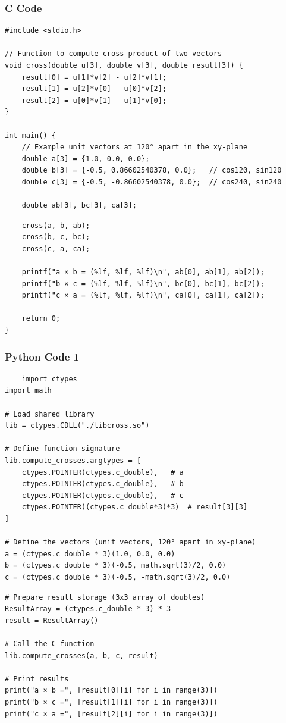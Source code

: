 \documentclass{beamer}
\begin{document}
\begin{frame}[fragile]
    \frametitle{C Code}
    \begin{lstlisting}
#include <stdio.h>

// Function to compute cross product of two vectors
void cross(double u[3], double v[3], double result[3]) {
    result[0] = u[1]*v[2] - u[2]*v[1];
    result[1] = u[2]*v[0] - u[0]*v[2];
    result[2] = u[0]*v[1] - u[1]*v[0];
}

int main() {
    // Example unit vectors at 120° apart in the xy-plane
    double a[3] = {1.0, 0.0, 0.0};
    double b[3] = {-0.5, 0.86602540378, 0.0};   // cos120, sin120
    double c[3] = {-0.5, -0.86602540378, 0.0};  // cos240, sin240

    double ab[3], bc[3], ca[3];
\end{lstlisting}
\end{frame}
\begin{frame}[fragile]
\begin{lstlisting}
    cross(a, b, ab);
    cross(b, c, bc);
    cross(c, a, ca);

    printf("a × b = (%lf, %lf, %lf)\n", ab[0], ab[1], ab[2]);
    printf("b × c = (%lf, %lf, %lf)\n", bc[0], bc[1], bc[2]);
    printf("c × a = (%lf, %lf, %lf)\n", ca[0], ca[1], ca[2]);

    return 0;
}

    \end{lstlisting}
\end{frame}

\begin{frame}[fragile]
    \frametitle{Python Code 1}
    \begin{lstlisting}
    import ctypes
import math

# Load shared library
lib = ctypes.CDLL("./libcross.so")

# Define function signature
lib.compute_crosses.argtypes = [
    ctypes.POINTER(ctypes.c_double),   # a
    ctypes.POINTER(ctypes.c_double),   # b
    ctypes.POINTER(ctypes.c_double),   # c
    ctypes.POINTER((ctypes.c_double*3)*3)  # result[3][3]
]

# Define the vectors (unit vectors, 120° apart in xy-plane)
a = (ctypes.c_double * 3)(1.0, 0.0, 0.0)
b = (ctypes.c_double * 3)(-0.5, math.sqrt(3)/2, 0.0)
c = (ctypes.c_double * 3)(-0.5, -math.sqrt(3)/2, 0.0)
\end{lstlisting}
\end{frame}
\begin{frame}[fragile]
\begin{lstlisting}
# Prepare result storage (3x3 array of doubles)
ResultArray = (ctypes.c_double * 3) * 3
result = ResultArray()

# Call the C function
lib.compute_crosses(a, b, c, result)

# Print results
print("a × b =", [result[0][i] for i in range(3)])
print("b × c =", [result[1][i] for i in range(3)])
print("c × a =", [result[2][i] for i in range(3)])

    \end{lstlisting}
\end{frame}
\end{document}
